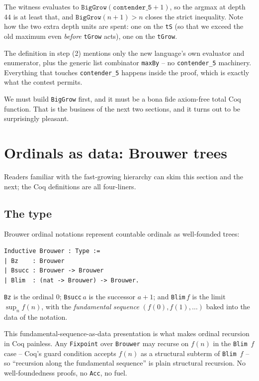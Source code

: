 \documentclass[11pt,a4paper]{article}
\theoremstyle{plain}
\theoremstyle{definition}
\theoremstyle{remark}
\begin{document}
The witness evaluates to
$\texttt{BigGrow}(\texttt{contender\_5}+1)$, so the argmax at depth
$44$ is at least that, and $\texttt{BigGrow}(n+1) > n$ closes the
strict inequality.  Note how the two extra depth units are spent:
one on the \texttt{tS} (so that we exceed the old maximum even
\emph{before} \texttt{tGrow} acts), one on the \texttt{tGrow}.

The definition in step (2) mentions only the new language's own
evaluator and enumerator, plus the generic list combinator
\texttt{maxBy} -- no \texttt{contender\_5} machinery.  Everything
that touches \texttt{contender\_5} happens inside the proof, which
is exactly what the contest permits.

We must build \texttt{BigGrow} first, and it must be a bona fide
axiom-free total Coq function.  That is the business of the next two
sections, and it turns out to be surprisingly pleasant.

\section{Ordinals as data: Brouwer trees}
\label{sec:brouwer}

Readers familiar with the fast-growing hierarchy can skim this section
and the next; the Coq definitions are all four-liners.

\subsection{The type}

Brouwer ordinal notations represent countable ordinals as well-founded
trees:

\begin{lstlisting}
Inductive Brouwer : Type :=
| Bz    : Brouwer
| Bsucc : Brouwer -> Brouwer
| Blim  : (nat -> Brouwer) -> Brouwer.
\end{lstlisting}

\texttt{Bz} is the ordinal $0$; \texttt{Bsucc}\,$a$ is the successor
$a+1$; and \texttt{Blim}\,$f$ is the limit $\sup_n f(n)$, with the
\emph{fundamental sequence} $(f(0), f(1), \ldots)$ baked into the data
of the notation.

This fundamental-sequence-as-data presentation is what makes ordinal
recursion in Coq painless.  Any \texttt{Fixpoint} over \texttt{Brouwer}
may recurse on $f(n)$ in the \texttt{Blim}~$f$ case -- Coq's guard
condition accepts $f(n)$ as a structural subterm of
\texttt{Blim}~$f$ -- so ``recursion along the fundamental sequence''
is plain structural recursion.  No well-foundedness proofs, no
\texttt{Acc}, no fuel.
\end{document}
